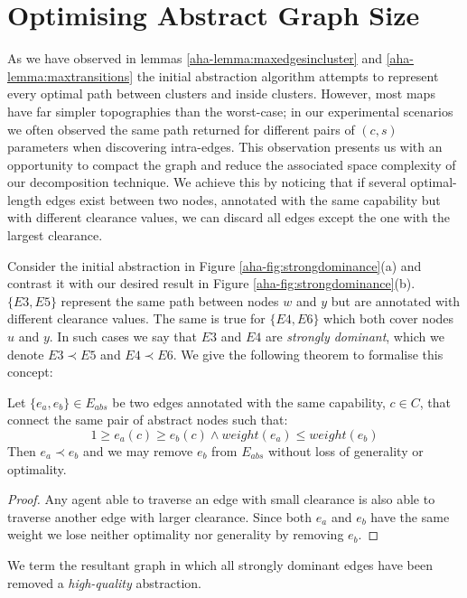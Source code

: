 \section{Optimising Abstract Graph Size}
\par \indent
As we have observed in lemmas \ref{aha-lemma:maxedgesincluster} and \ref{aha-lemma:maxtransitions} the initial abstraction algorithm attempts to represent every optimal path between clusters and inside clusters.
However, most maps have far simpler topographies than the worst-case; in our  experimental scenarios we often observed the same path returned for different pairs of $(c, s)$ parameters when discovering intra-edges.
This observation presents us with an opportunity to compact the graph and reduce the associated space complexity of our decomposition technique. 
We achieve this by noticing that if several optimal-length edges exist between two nodes, annotated with the same capability but with different clearance values, we can discard all edges except the one with the largest clearance. 
\par \indent
Consider the initial abstraction in Figure \ref{aha-fig:strongdominance}(a) and contrast it with our desired result in Figure \ref{aha-fig:strongdominance}(b). $\lbrace E3, E5 \rbrace$ represent the same path between nodes $w$ and $y$ but are annotated with different clearance values. 
The same is true  for $\lbrace E4, E6 \rbrace$ which both cover nodes $u$ and $y$. In such cases we say that $E3$ and $E4$ are \emph{strongly dominant}, which we denote $E3 \prec E5$ and $E4 \prec E6$. We give the following theorem to formalise this concept:

\begin{theorem}
\label{aha-definition:strongdominance}
Let $\lbrace e_{a}, e_{b} \rbrace \in E_{abs}$ be two edges annotated with the same capability, $c \in C$, that connect the same pair of abstract nodes such that:
$$ 1 \geq e_{a}(c) \geq e_{b}(c) \wedge weight(e_{a}) \leq weight(e_{b})$$
Then $e_{a} \prec e_{b}$ and we may remove $e_{b}$ from $E_{abs}$ without loss of generality or optimality.
\end{theorem}
\begin{proof}
Any agent able to traverse an edge with small clearance is also able to traverse another edge with larger clearance. Since both $e_{a}$ and $e_{b}$ have the same weight we lose neither optimality nor generality by removing $e_{b}$.
\end{proof}
We term the resultant graph in which all strongly dominant edges have been removed a \emph{high-quality} abstraction.  


